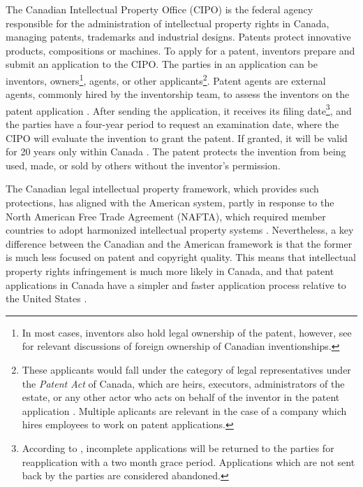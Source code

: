 \documentclass[../main.tex]{subfiles}
\begin{document}
The Canadian Intellectual Property Office (CIPO) is the federal agency responsible for the administration of intellectual property rights in Canada, managing patents, trademarks and industrial designs. Patents protect innovative products, compositions or machines. To apply for a patent, inventors prepare and submit an application to the CIPO. The parties in an application can be inventors, owners\footnote{In most cases, inventors also hold legal ownership of the patent, however, see \textcite{alam_etal22, beaudry_schiffauerova11} for relevant discussions of foreign ownership of Canadian inventionships.}, agents, or other applicants\footnote{These applicants would fall under the category of legal representatives under the \textit{Patent Act} of Canada, which are heirs, executors, administrators of the estate, or any other actor who acts on behalf of the inventor in the patent application \parencite{Patent85}. Multiple aplicants are relevant in the case of a company which hires employees to work on patent applications.}. Patent agents are external agents, commonly hired by the inventorship team, to assess the inventors on the patent application \parencite{putnam06}. After sending the application, it receives its filing date\footnote{According to \textcite{canadianintellectualpropertyoffice21}, incomplete applications will be returned to the parties for reapplication with a two month grace period. Applications which are not sent back by the parties are considered abandoned.}, and the parties have a four-year period to request an examination date, where the CIPO will evaluate the invention to grant the patent. If granted, it will be valid for 20 years only within Canada \parencite{abbes_etal22}. The patent protects the invention from being used, made, or sold by others without the inventor's permission. 




The Canadian legal intellectual property framework, which provides such protections, has aligned with the American system, partly in response to the North American Free Trade Agreement (NAFTA), which required member countries to adopt harmonized intellectual property systems \parencite{putnam06}. Nevertheless, a key difference between the Canadian and the American framework is that the former is much less focused on patent and copyright quality. This means that intellectual property rights infringement is much more likely in Canada, and that patent applications in Canada have a simpler and faster application process relative to the United States \parencite{vaver06}. 
\end{document}
